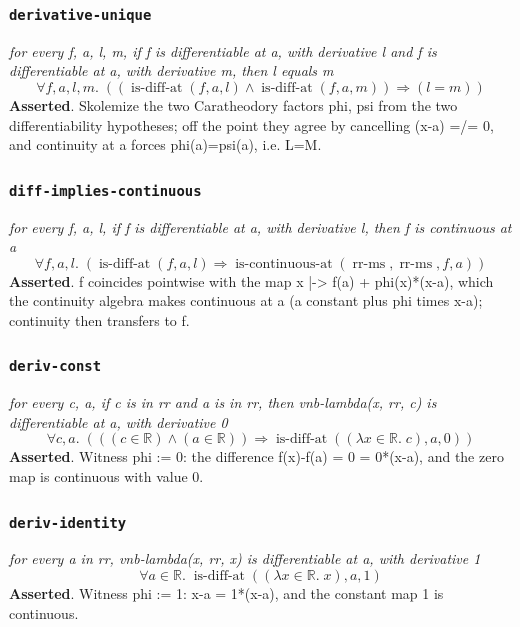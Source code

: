 \documentclass[11pt]{article}
\begin{document}
\subsubsection*{\texttt{derivative-unique}}
\emph{for every f, a, l, m, if f is differentiable at a, with derivative l and f is differentiable at a, with derivative m, then l equals m}
{\small\[
\forall f, a, l, m.\; ((\operatorname{is\text{-}diff\text{-}at}(f, a, l) \wedge \operatorname{is\text{-}diff\text{-}at}(f, a, m)) \Rightarrow (l = m))
\]}
\noindent\textbf{Asserted}. Skolemize the two Caratheodory factors phi, psi from the two differentiability hypotheses; off the point they agree by cancelling (x-a) =/= 0, and continuity at a forces phi(a)=psi(a), i.e. L=M.

\subsubsection*{\texttt{diff-implies-continuous}}
\emph{for every f, a, l, if f is differentiable at a, with derivative l, then f is continuous at a}
{\small\[
\forall f, a, l.\; (\operatorname{is\text{-}diff\text{-}at}(f, a, l) \Rightarrow \operatorname{is\text{-}continuous\text{-}at}(\operatorname{rr\text{-}ms}, \operatorname{rr\text{-}ms}, f, a))
\]}
\noindent\textbf{Asserted}. f coincides pointwise with the map x |-> f(a) + phi(x)*(x-a), which the continuity algebra makes continuous at a (a constant plus phi times x-a); continuity then transfers to f.

\subsubsection*{\texttt{deriv-const}}
\emph{for every c, a, if c is in rr and a is in rr, then vnb-lambda(x, rr, c) is differentiable at a, with derivative 0}
{\small\[
\forall c, a.\; (((c \in \mathbb{R}) \wedge (a \in \mathbb{R})) \Rightarrow \operatorname{is\text{-}diff\text{-}at}((\lambda x \in \mathbb{R}.\; c), a, 0))
\]}
\noindent\textbf{Asserted}. Witness phi := 0: the difference f(x)-f(a) = 0 = 0*(x-a), and the zero map is continuous with value 0.

\subsubsection*{\texttt{deriv-identity}}
\emph{for every a in rr, vnb-lambda(x, rr, x) is differentiable at a, with derivative 1}
{\small\[
\forall a \in \mathbb{R}.\; \operatorname{is\text{-}diff\text{-}at}((\lambda x \in \mathbb{R}.\; x), a, 1)
\]}
\noindent\textbf{Asserted}. Witness phi := 1: x-a = 1*(x-a), and the constant map 1 is continuous.
\end{document}
